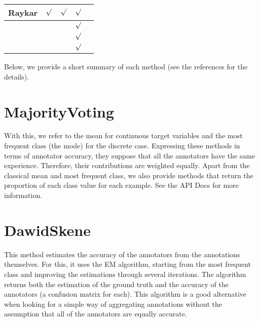 \documentclass[letterpaper,10pt,english]{sphinxmanual}
\begin{document}
\begin{savenotes}
\begin{tabulary}{\linewidth}[t]{|T|T|T|T|T|}
\\
\hline
Raykar
&
\(\surd\)
&
\(\surd\)
&
\(\surd\)
&
\\
\hline
{}
&&&
\(\surd\)
&
\\
\hline
{}
&&&
\(\surd\)
&
\\
\hline
{}
&&&
\(\surd\)
&
\\
\hline
\end{tabulary}
\par
\sphinxattableend\end{savenotes}

Below, we provide a short summary of each method (see the references for the details). 


\section{MajorityVoting}
\label{\detokenize{package/methods:id2}}
With this, we refer to the mean for continuous target variables and the most frequent class (the mode) for the discrete
case. Expressing these methods in terms of annotator accuracy, they suppose that all the annotators have
the same experience. Therefore, their contributions are weighted equally. Apart from the classical mean and
most frequent class, we also provide methods that return the proportion of each class value for each example.
See the API Docs for more information.


\section{DawidSkene}
\label{\detokenize{package/methods:id3}}
This method estimates the accuracy of the annotators from the annotations themselves. For this, it uses the EM
algorithm, starting from the most frequent class and improving the estimations through several iterations. The
algorithm returns both the estimation of the ground truth and the accuracy of the annotators (a confusion
matrix for each). This algorithm is a good alternative when looking for a simple way of aggregating annotations
without the assumption that all of the annotators are equally accurate.
\end{document}
